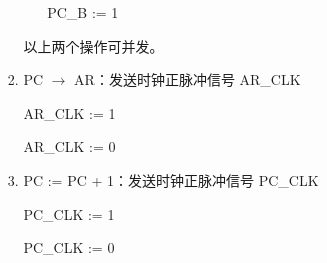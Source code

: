 \begin{enumerate}
\begin{itemize}
\begin{enumerate}
\begin{itemize}
                PC\_B := 1
                
            \end{itemize}
            
            以上两个操作可并发。
            
            \item PC $\to$ AR：发送时钟正脉冲信号 AR\_CLK
            
            AR\_CLK := 1
            
            AR\_CLK := 0
            
            \item PC := PC + 1：发送时钟正脉冲信号 PC\_CLK
            
            PC\_CLK := 1
            
            PC\_CLK := 0
            
        \end{enumerate}

    \end{itemize}
    
\end{enumerate}

